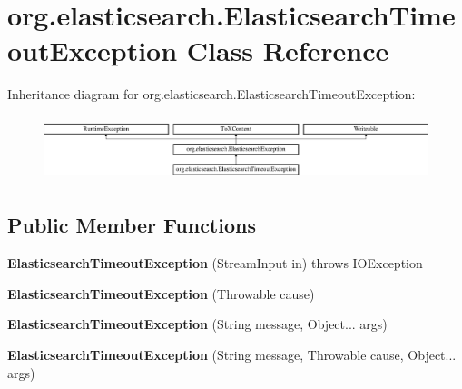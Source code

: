 \hypertarget{classorg_1_1elasticsearch_1_1_elasticsearch_timeout_exception}{}\section{org.\+elasticsearch.\+Elasticsearch\+Timeout\+Exception Class Reference}
\label{classorg_1_1elasticsearch_1_1_elasticsearch_timeout_exception}
Inheritance diagram for org.\+elasticsearch.\+Elasticsearch\+Timeout\+Exception\+:\begin{figure}[H]
\begin{center}
\leavevmode
\includegraphics[height=1.891892cm]{classorg_1_1elasticsearch_1_1_elasticsearch_timeout_exception}
\end{center}
\end{figure}
\subsection*{Public Member Functions}
\begin{DoxyCompactItemize}
\item 
\hypertarget{classorg_1_1elasticsearch_1_1_elasticsearch_timeout_exception_a75e569df0ac602133309d78ac8531fce}{}\label{classorg_1_1elasticsearch_1_1_elasticsearch_timeout_exception_a75e569df0ac602133309d78ac8531fce} 
{\bfseries Elasticsearch\+Timeout\+Exception} (Stream\+Input in)  throws I\+O\+Exception 
\item 
\hypertarget{classorg_1_1elasticsearch_1_1_elasticsearch_timeout_exception_a31dd242c41e7ff8bf03820c2caeabf57}{}\label{classorg_1_1elasticsearch_1_1_elasticsearch_timeout_exception_a31dd242c41e7ff8bf03820c2caeabf57} 
{\bfseries Elasticsearch\+Timeout\+Exception} (Throwable cause)
\item 
\hypertarget{classorg_1_1elasticsearch_1_1_elasticsearch_timeout_exception_addec6eeeccdb9082d6beab843d5f6230}{}\label{classorg_1_1elasticsearch_1_1_elasticsearch_timeout_exception_addec6eeeccdb9082d6beab843d5f6230} 
{\bfseries Elasticsearch\+Timeout\+Exception} (String message, Object... args)
\item 
\hypertarget{classorg_1_1elasticsearch_1_1_elasticsearch_timeout_exception_adc4d4ca87a4c97153419994d176e1317}{}\label{classorg_1_1elasticsearch_1_1_elasticsearch_timeout_exception_adc4d4ca87a4c97153419994d176e1317} 
{\bfseries Elasticsearch\+Timeout\+Exception} (String message, Throwable cause, Object... args)
\end{DoxyCompactItemize}
